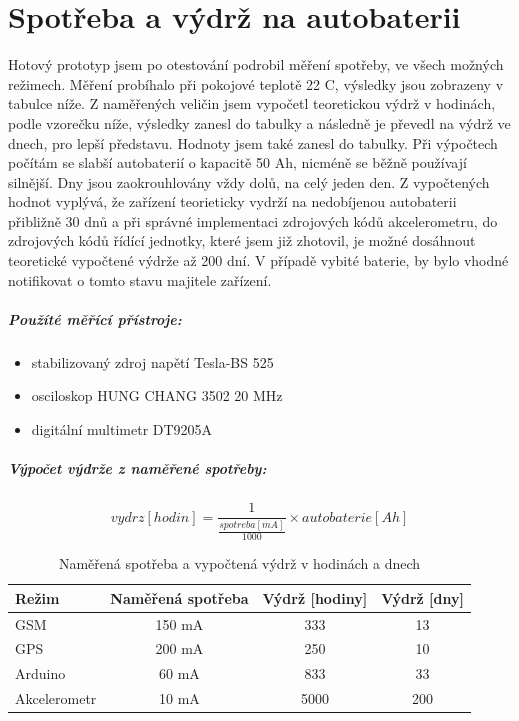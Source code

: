 \documentclass[FM,MP]{tulthesis}  %
\begin{document}

\chapter{Spotřeba a výdrž na autobaterii}
Hotový prototyp jsem po otestování podrobil měření spotřeby, ve všech možných režimech. Měření probíhalo při pokojové teplotě 22 \degree C, výsledky jsou zobrazeny v tabulce níže. Z naměřených veličin jsem vypočetl teoretickou výdrž v hodinách, podle vzorečku níže, výsledky zanesl do tabulky a následně je převedl na výdrž ve dnech, pro lepší představu. Hodnoty jsem také zanesl do tabulky. Při výpočtech počítám se slabší autobaterií o kapacitě 50 Ah, nicméně se běžně používají silnější. Dny jsou zaokrouhlovány vždy dolů, na celý jeden den. Z vypočtených hodnot vyplývá, že zařízení teorieticky vydrží na nedobíjenou autobaterii přibližně 30 dnů a při správné implementaci zdrojových kódů akcelerometru, do zdrojových kódů řídící jednotky, které jsem již zhotovil, je možné dosáhnout teoretické vypočtené výdrže až 200 dní. V případě vybité baterie, by bylo vhodné notifikovat o tomto stavu majitele zařízení.

\paragraph{Použíté měřící přístroje:}
\begin{itemize}
\item stabilizovaný zdroj napětí Tesla-BS 525
\item osciloskop HUNG CHANG 3502 20 MHz
\item digitální multimetr DT9205A
\end{itemize}

\paragraph{Výpočet výdrže z naměřené spotřeby:}
$$ vydrz [hodin] = \frac{1}{\frac{spotreba[mA]}{1000}} \times autobaterie[Ah] $$

\renewcommand{\arraystretch}{1.5}
\begin{table}[H]
\begin{center}
\begin{tabular}{| l | c | c |  c |}
\hline
Režim & Naměřená spotřeba & Výdrž [hodiny] & Výdrž [dny]\\
\hline
\hline
GSM & 150 mA & 333 & 13\\
\hline
GPS & 200 mA & 250 & 10\\
\hline
Arduino & 60 mA & 833 & 33\\
\hline
Akcelerometr & 10 mA & 5000 & 200\\
\hline
\end{tabular}
\end{center}
\caption{Naměřená spotřeba a vypočtená výdrž v hodinách a dnech}
\end{table}
\end{document}
